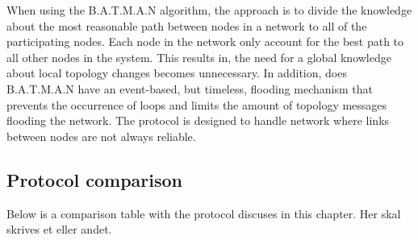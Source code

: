 When using the B.A.T.M.A.N algorithm, the approach is to divide the knowledge about the most reasonable path between nodes in a network to all of the participating nodes.
Each node in the network only account for the best path to all other nodes in the system.
This results in, the need for a global knowledge about local topology changes becomes unnecessary.
In addition, does B.A.T.M.A.N have an event-based, but timeless, flooding mechanism that prevents the occurrence of loops and limits the amount of topology messages flooding the network.
The protocol is designed to handle network where links between nodes are not always reliable\cite{BATMAN}.

\subsection{Protocol comparison}
Below is a comparison table with the protocol discuses in this chapter. Her skal skrives et eller andet.

